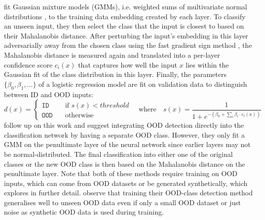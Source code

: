 \newpar \textcite{ood-adversarial-detection-2018} fit Gaussian mixture models (GMMs), i.e. weighted sums of multivariate normal distributions \cite{gmm-encyclopedia-2009}, to the training data embedding created by each layer. To classify an unseen input, they then select the class that the input is closest to based on their Mahalanobis distance. After perturbing the input's embedding in this layer adversarially away from the chosen class using the fast gradient sign method \cite{fast-gradient-2014}, the Mahalanobis distance is measured again and translated into a per-layer confidence score ${c}_{i}(x)$ that captures how well the input $x$ lies within the Gaussian fit of the class distribution in this layer. Finally, the parameters $\{ \beta_0, \beta_1, ... \}$ of a logistic regression model are fit on validation data to distinguish between ID and OOD inputs:
\begin{equation*}
    d(x) = \begin{cases}
        \texttt{ID} \quad & \text{if } s(x) < threshold \\
        \texttt{OOD} \quad & \text{otherwise}
    \end{cases} \quad \text{where} \quad s(x) = \frac{1}{1 + e^{-(\beta_0 + \sum_{i}\beta_i \cdot {c}_{i}(x))}}
\end{equation*}
\textcite{ood-class-2022} follow up on this work and suggest integrating OOD detection directly into the classification network by having a separate OOD class. However, they only fit a GMM on the penultimate layer of the neural network since earlier layers may not be normal-distributed. The final classification into either one of the original classes or the new OOD class is then based on the Mahalanobis distance on the penultimate layer. Note that both of these methods require training on OOD inputs, which can come from OOD datasets or be generated synthetically, which  explores in further detail. \citeauthor{ood-class-2022} observe that training their OOD-class detection method generalises well to unseen OOD data even if only a small OOD dataset or just noise as synthetic OOD data is used during training.

